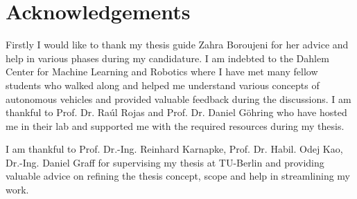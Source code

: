 \chapter*{Acknowledgements}

Firstly I would like to thank my thesis guide Zahra Boroujeni for her advice and help in various phases during my candidature. I am indebted to the Dahlem Center for Machine Learning and Robotics where I have met many fellow students who walked along and helped me understand various concepts of autonomous vehicles and provided valuable feedback during the discussions. I am thankful to Prof. Dr. Raúl Rojas and Prof. Dr. Daniel Göhring who have hosted me in their lab and supported me with the required resources during my thesis. 

I am thankful to Prof. Dr.-Ing. Reinhard Karnapke, Prof. Dr. Habil. Odej Kao, Dr.-Ing. Daniel Graff for supervising my thesis at TU-Berlin and providing valuable advice on refining the thesis concept, scope and help in streamlining my work. 
